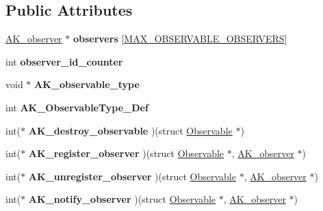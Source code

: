 \subsection*{Public Attributes}
\begin{DoxyCompactItemize}
\item 
\mbox{\label{structObservable_aaf1c78b6fa8ab64b0831548f01a40a8d}} 
\hyperlink{structObserver}{A\+K\+\_\+observer} $\ast$ {\bfseries observers} \mbox{[}\hyperlink{constants_8h_a21b0a9aeec5879330e9e72236546b1bf}{M\+A\+X\+\_\+\+O\+B\+S\+E\+R\+V\+A\+B\+L\+E\+\_\+\+O\+B\+S\+E\+R\+V\+E\+RS}\mbox{]}
\item 
\mbox{\label{structObservable_aad1b43fa6d3981416983c2e3fd51c189}} 
int {\bfseries observer\+\_\+id\+\_\+counter}
\item 
\mbox{\label{structObservable_a406f82d9d46d032cc3563a5819779c7d}} 
void $\ast$ {\bfseries A\+K\+\_\+observable\+\_\+type}
\item 
\mbox{\label{structObservable_ac26b2477eecd32a2abcd55785b962948}} 
int {\bfseries A\+K\+\_\+\+Observable\+Type\+\_\+\+Def}
\item 
\mbox{\label{structObservable_adaf56ebad6c6ab392bb83f14edade728}} 
int($\ast$ {\bfseries A\+K\+\_\+destroy\+\_\+observable} )(struct \hyperlink{structObservable}{Observable} $\ast$)
\item 
\mbox{\label{structObservable_a82189d03a81ed2f8020828dc72699d8e}} 
int($\ast$ {\bfseries A\+K\+\_\+register\+\_\+observer} )(struct \hyperlink{structObservable}{Observable} $\ast$, \hyperlink{structObserver}{A\+K\+\_\+observer} $\ast$)
\item 
\mbox{\label{structObservable_a557da5ed3eb4a8a2a31ea9a0bb4d734a}} 
int($\ast$ {\bfseries A\+K\+\_\+unregister\+\_\+observer} )(struct \hyperlink{structObservable}{Observable} $\ast$, \hyperlink{structObserver}{A\+K\+\_\+observer} $\ast$)
\item 
\mbox{\label{structObservable_a1f1d9c796b5cd83ed0d6d64ff8ccc402}} 
int($\ast$ {\bfseries A\+K\+\_\+notify\+\_\+observer} )(struct \hyperlink{structObservable}{Observable} $\ast$, \hyperlink{structObserver}{A\+K\+\_\+observer} $\ast$)

\end{DoxyCompactItemize}
